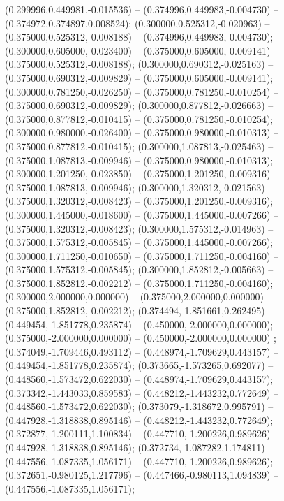  (0.299996,0.449981,-0.015536) -- (0.374996,0.449983,-0.004730) -- (0.374972,0.374897,0.008524);
 (0.300000,0.525312,-0.020963) -- (0.375000,0.525312,-0.008188) -- (0.374996,0.449983,-0.004730);
 (0.300000,0.605000,-0.023400) -- (0.375000,0.605000,-0.009141) -- (0.375000,0.525312,-0.008188);
 (0.300000,0.690312,-0.025163) -- (0.375000,0.690312,-0.009829) -- (0.375000,0.605000,-0.009141);
 (0.300000,0.781250,-0.026250) -- (0.375000,0.781250,-0.010254) -- (0.375000,0.690312,-0.009829);
 (0.300000,0.877812,-0.026663) -- (0.375000,0.877812,-0.010415) -- (0.375000,0.781250,-0.010254);
 (0.300000,0.980000,-0.026400) -- (0.375000,0.980000,-0.010313) -- (0.375000,0.877812,-0.010415);
 (0.300000,1.087813,-0.025463) -- (0.375000,1.087813,-0.009946) -- (0.375000,0.980000,-0.010313);
 (0.300000,1.201250,-0.023850) -- (0.375000,1.201250,-0.009316) -- (0.375000,1.087813,-0.009946);
 (0.300000,1.320312,-0.021563) -- (0.375000,1.320312,-0.008423) -- (0.375000,1.201250,-0.009316);
 (0.300000,1.445000,-0.018600) -- (0.375000,1.445000,-0.007266) -- (0.375000,1.320312,-0.008423);
 (0.300000,1.575312,-0.014963) -- (0.375000,1.575312,-0.005845) -- (0.375000,1.445000,-0.007266);
 (0.300000,1.711250,-0.010650) -- (0.375000,1.711250,-0.004160) -- (0.375000,1.575312,-0.005845);
 (0.300000,1.852812,-0.005663) -- (0.375000,1.852812,-0.002212) -- (0.375000,1.711250,-0.004160);
 (0.300000,2.000000,0.000000) -- (0.375000,2.000000,0.000000) -- (0.375000,1.852812,-0.002212);
 (0.374494,-1.851661,0.262495) -- (0.449454,-1.851778,0.235874) -- (0.450000,-2.000000,0.000000);
 (0.375000,-2.000000,0.000000) -- (0.450000,-2.000000,0.000000) ;
 (0.374049,-1.709446,0.493112) -- (0.448974,-1.709629,0.443157) -- (0.449454,-1.851778,0.235874);
 (0.373665,-1.573265,0.692077) -- (0.448560,-1.573472,0.622030) -- (0.448974,-1.709629,0.443157);
 (0.373342,-1.443033,0.859583) -- (0.448212,-1.443232,0.772649) -- (0.448560,-1.573472,0.622030);
 (0.373079,-1.318672,0.995791) -- (0.447928,-1.318838,0.895146) -- (0.448212,-1.443232,0.772649);
 (0.372877,-1.200111,1.100834) -- (0.447710,-1.200226,0.989626) -- (0.447928,-1.318838,0.895146);
 (0.372734,-1.087282,1.174811) -- (0.447556,-1.087335,1.056171) -- (0.447710,-1.200226,0.989626);
 (0.372651,-0.980125,1.217796) -- (0.447466,-0.980113,1.094839) -- (0.447556,-1.087335,1.056171);

